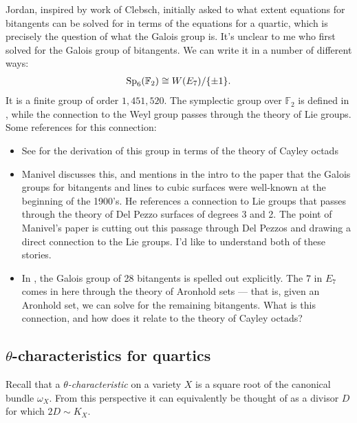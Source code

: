 \documentclass[11pt]{amsart}
\begin{document}
Jordan, inspired by work of Clebsch, initially asked to what extent equations for bitangents can be solved for in terms of the equations for a quartic, which is precisely the question of what the Galois group is. It's unclear to me who first solved for the Galois group of bitangents. We can write it in a number of different ways:
\begin{align*}
    \mathrm{Sp}_6(\mathbb{F}_2) \cong W(E_7)/\{\pm 1\}.
\end{align*}
It is a finite group of order $1,451,520$. The symplectic group over $\mathbb{F}_2$ is defined in , while the connection to the Weyl group passes through the theory of Lie groups. Some references for this connection:
\begin{itemize}
    \item See \cite[Theorem~9]{DolgachevOrtland} for the derivation of this group in terms of the theory of Cayley octads
    \item Manivel \cite{Manivel2006} discusses this, and mentions in the intro to the paper that the Galois groups for bitangents and lines to cubic surfaces were well-known at the beginning of the 1900's. He references a connection to Lie groups that passes through the theory of Del Pezzo surfaces of degrees 3 and 2. The point of Manivel's paper is cutting out this passage through Del Pezzos and drawing a direct connection to the Lie groups. I'd like to understand both of these stories.
    \item In \cite[p.~367]{MillerBlichfeldtDickson}, the Galois group of 28 bitangents is spelled out explicitly. The $7$ in $E_7$ comes in here through the theory of Aronhold sets --- that is, given an Aronhold set, we can solve for the remaining bitangents. What is this connection, and how does it relate to the theory of Cayley octads?
\end{itemize}

\subsection{\texorpdfstring{$\theta$}{theta}-characteristics for quartics}

Recall that a $\theta$\textit{-characteristic} on a variety $X$ is a square root of the canonical bundle $\omega_X$. From this perspective it can equivalently be thought of as a divisor $D$ for which $2D \sim K_X$.
\end{document}
